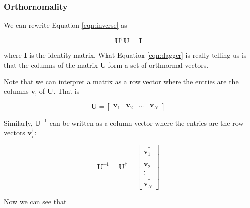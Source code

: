 \documentclass[11pt, oneside]{article}   	%
\begin{document}
\subsubsection{Orthornomality}
We can rewrite Equation \ref{eqn:inverse} as

\begin{equation}
\mathbf{U}^{\dagger} \mathbf{U} = \mathbf{I}
\label{eqn:dagger}
\end{equation}

\bigskip
\noindent
where \textbf{I} is the identity matrix. What Equation \ref{eqn:dagger} is really telling us is that the columns of the matrix \textbf{U} form a set of orthnormal vectors.

\bigskip
\noindent
Note that we can interpret a matrix as a row vector where the entries are the columns  $\mathbf{v}_i$ of \textbf{U}. That is

\begin{equation*}
\mathbf{U} = \begin{bmatrix} \mathbf{v}_1 & \mathbf{v}_2 & \hdots & \mathbf{v}_{N} \end{bmatrix}
\end{equation*}

\bigskip
\noindent
Similarly, $\mathbf{U}^{-1}$ can be written as a column vector where the entries are the row vectors $ \mathbf{v}_{i}^\dagger$:

\begin{equation*}
\mathbf{U}^{-1} = \mathbf{U}^{\dagger} = \begin{bmatrix} \mathbf{v}_1^\dagger \\ \mathbf{v}_2^\dagger \\ \vdots  \\ \mathbf{v}_{N}^\dagger  \end{bmatrix}
\end{equation*}

\bigskip
\noindent
Now we can see that 
\end{document}
